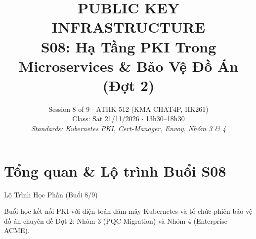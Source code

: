 
\title{\color{hcmutblue}\textbf{\LARGE PUBLIC KEY INFRASTRUCTURE}\\[0.25em]
       \color{hcmutblue}\textbf{\large S08: Hạ Tầng PKI Trong Microservices \& Bảo Vệ Đồ Án (Đợt 2)}}
\date{\footnotesize Session 8 of 9 $\cdot$ ATHK 512 (KMA CHAT4P, HK261)\\
      Class: Sat 21/11/2026 $\cdot$ 13h30--18h30\\
      \textit{Standards: Kubernetes PKI, Cert-Manager, Envoy, Nhóm 3 \& 4}}


\PKItitleframe

\section{Tổng quan \& Lộ trình Buổi S08}

\begin{frame}{Lộ Trình Học Phần (Buổi 8/9)}
  \centering
  \vspace{0.4em}
  \raggedright\small
  Buổi học kết nối PKI với điện toán đám mây Kubernetes và tổ chức phiên bảo vệ đồ án chuyên đề Đợt 2: Nhóm 3 (PQC Migration) và Nhóm 4 (Enterprise ACME).
\end{frame}

